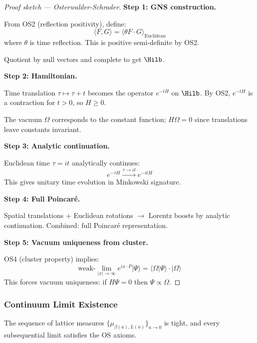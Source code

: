 \begin{proof}[Proof sketch --- Osterwalder-Schrader]
\textbf{Step 1: GNS construction.}

From OS2 (reflection positivity), define:
\[
\langle F, G \rangle = \langle \theta F \cdot G \rangle_{\text{Euclidean}}
\]
where $\theta$ is time reflection. This is positive semi-definite by OS2.

Quotient by null vectors and complete to get $\Hilb$.

\textbf{Step 2: Hamiltonian.}

Time translation $\tau \mapsto \tau + t$ becomes the operator $e^{-tH}$ on $\Hilb$.
By OS2, $e^{-tH}$ is a contraction for $t > 0$, so $H \geq 0$.

The vacuum $\Omega$ corresponds to the constant function; $H\Omega = 0$ since 
translations leave constants invariant.

\textbf{Step 3: Analytic continuation.}

Euclidean time $\tau = it$ analytically continues:
\[
e^{-\tau H} \xrightarrow{\tau \to it} e^{-itH}
\]
This gives unitary time evolution in Minkowski signature.

\textbf{Step 4: Full Poincar\'e.}

Spatial translations + Euclidean rotations $\to$ Lorentz boosts by analytic continuation.
Combined: full Poincar\'e representation.

\textbf{Step 5: Vacuum uniqueness from cluster.}

OS4 (cluster property) implies:
\[
\text{weak-}\lim_{|x| \to \infty} e^{ix \cdot P} |\Psi\rangle = \langle \Omega | \Psi \rangle \cdot |\Omega\rangle
\]
This forces vacuum uniqueness: if $H\Psi = 0$ then $\Psi \propto \Omega$.
\end{proof}

\subsubsection{Continuum Limit Existence}

\begin{theorem}
\label{thm:tightness-complete}
The sequence of lattice measures $\{\mu_{\beta(a),L(a)}\}_{a \to 0}$ is tight, 
and every subsequential limit satisfies the OS axioms.
\end{theorem}

